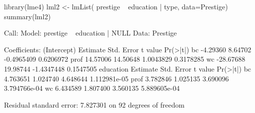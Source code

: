 \begin{Schunk}
\begin{Sinput}
 library(lme4)
 lml2 <- lmList( prestige ~ education | type, data=Prestige)
 summary(lml2)
\end{Sinput}
\begin{Soutput}
Call:
  Model: prestige ~ education | NULL 
   Data: Prestige 

Coefficients:
   (Intercept) 
      Estimate Std. Error    t value  Pr(>|t|)
bc    -4.29360    8.64702 -0.4965409 0.6206972
prof  14.57006   14.50648  1.0043829 0.3178285
wc   -28.67688   19.98744 -1.4347448 0.1547505
   education 
     Estimate Std. Error  t value     Pr(>|t|)
bc   4.763651   1.024740 4.648644 1.112981e-05
prof 3.782846   1.025135 3.690096 3.794766e-04
wc   6.434589   1.807400 3.560135 5.889605e-04

Residual standard error: 7.827301 on 92 degrees of freedom
\end{Soutput}
\end{Schunk}
